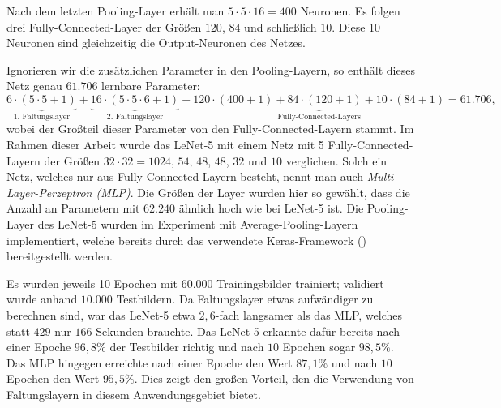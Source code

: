 \documentclass[paper=a4, 	%
		fontsize=11pt,
		abstract=true, 	%
		headsepline, 	%
		notitlepage	%
		]{scrartcl}
\theoremstyle{definition}
\begin{document}
Nach dem letzten Pooling-Layer erhält man $5\cdot 5\cdot 16 = 400$ Neuronen.
Es folgen drei Fully-Connected-Layer der Größen $120$, $84$ und schließlich $10$.
Diese 10 Neuronen sind gleichzeitig die Output-Neuronen des Netzes.

Ignorieren wir die zusätzlichen Parameter in den Pooling-Layern, so enthält dieses Netz genau $61{.}706$ lernbare Parameter:
\[
    \underbrace{6\cdot (5\cdot 5 + 1)}_{\text{1. Faltungslayer}} + 
    \underbrace{16\cdot (5\cdot 5\cdot 6 + 1)}_{\text{2. Faltungslayer}}  + 
    \underbrace{120\cdot(400+1) + 84\cdot(120+1) + 10 \cdot (84+1)}_{\text{Fully-Connected-Layers}}
    = 61{.}706,
\]
wobei der Großteil dieser Parameter von den Fully-Connected-Layern stammt.
Im Rahmen dieser Arbeit wurde das LeNet-5 mit einem Netz mit 5 Fully-Connected-Layern der Größen $32\cdot 32=1024$, $54$, $48$, $48$, $32$ und $10$ verglichen.
Solch ein Netz, welches nur aus Fully-Connected-Layern besteht, nennt man auch \emph{\foreignlanguage{english}{Multi-Layer-Perzeptron} (MLP)}.
Die Größen der Layer wurden hier so gewählt, dass die Anzahl an Parametern mit $62{.}240$ ähnlich hoch wie bei LeNet-5 ist.
Die Pooling-Layer des LeNet-5 wurden im Experiment mit Average-Pooling-Layern implementiert, welche bereits durch das verwendete Keras-Framework (\cite{chollet2015keras}) bereitgestellt werden.

Es wurden jeweils 10 Epochen mit $60{.}000$ Trainingsbilder trainiert; validiert wurde anhand $10{.}000$ Testbildern.
Da Faltungslayer etwas aufwändiger zu berechnen sind, war das LeNet-5 etwa $2{,}6$-fach langsamer als das MLP, welches statt $429$ nur $166$ Sekunden brauchte.
Das LeNet-5 erkannte dafür bereits nach einer Epoche $96{,}8\%$ der Testbilder richtig und nach $10$ Epochen sogar $98{,}5\%$.
Das MLP hingegen erreichte nach einer Epoche den Wert $87{,}1\%$ und nach $10$ Epochen den Wert $95{,}5\%$.
Dies zeigt den großen Vorteil, den die Verwendung von Faltungslayern in diesem Anwendungsgebiet bietet.


\clearpage %
\thispagestyle{empty}

\end{document}

